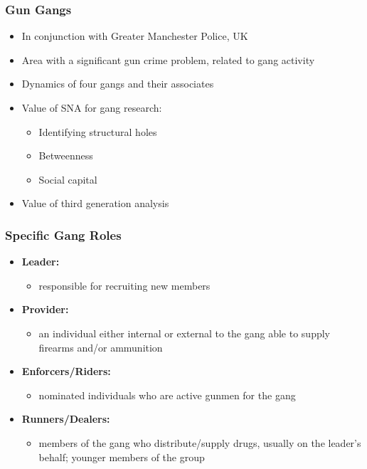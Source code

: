\documentclass[pdftex]{beamer}
\begin{document}
\begin{frame}
\frametitle{Gun Gangs}
\begin{itemize}
\item In conjunction with Greater Manchester Police, UK
\item Area with a significant gun crime problem, related to gang activity
\item Dynamics of four gangs and their associates
\item Value of SNA for gang research:
\begin{itemize}
\item Identifying structural holes
\item Betweenness
\item Social capital
\end{itemize}
\item Value of third generation analysis
\end{itemize}
\end{frame}

\begin{frame}
\frametitle{Specific Gang Roles}
\begin{itemize}
\item {\textbf{Leader:}}
\begin{itemize}
\item responsible for recruiting new members
\end{itemize}
\item {\textbf{Provider:}}
\begin{itemize}
\item an individual either internal or external to the gang able to
  supply firearms and/or ammunition
\end{itemize}
\item {\textbf{Enforcers/Riders:}}
\begin{itemize}
\item nominated individuals who are active gunmen for the gang
\end{itemize}
\item {\textbf{Runners/Dealers:}}
\begin{itemize}
\item members of the gang who distribute/supply drugs, usually on the
  leader's behalf; younger members of the group
\end{itemize}
\end{itemize}
\end{frame}
\end{document}
